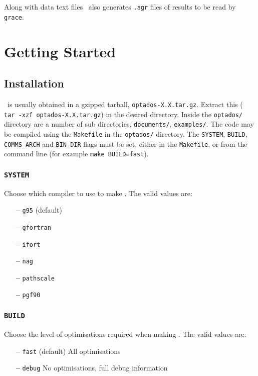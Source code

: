 \documentclass[a4paper,11pt,twoside]{book}
\begin{document}
Along with data text files \optados\ also generates \verb#.agr# files of results to be read by \verb#grace#. 


\chapter{Getting Started}\label{chap:getting_started}
\section{Installation}
\optados\ is usually obtained in a gzipped tarball, \verb#optados-X.X.tar.gz#. Extract this ( \verb# tar -xzf optados-X.X.tar.gz#) in the desired directory. Inside the  \verb#optados/# directory are a number of sub directories,  \verb#documents/#,   \verb#examples/#.  The code may be compiled using the \verb#Makefile# in the  \verb#optados/# directory.  The \verb#SYSTEM#, \verb#BUILD#, \verb#COMMS_ARCH# and \verb#BIN_DIR# flags must be set, either in the  \verb#Makefile#, or from the command line (for example  \verb#make BUILD=fast#).  

\subsection[system]{\tt SYSTEM}

Choose which compiler to use to make \optados. The valid values are:
\begin{itemize}
\item[{\bf --}]  \verb#g95# (default)
\item[{\bf --}]  \verb#gfortran#
\item[{\bf --}]  \verb#ifort#
\item[{\bf --}]  \verb#nag#
\item[{\bf --}]  \verb#pathscale#
\item[{\bf --}]  \verb#pgf90#
\end{itemize}

\subsection[build]{\tt BUILD}

Choose the level of optimisations required when making \optados.  The valid values are:
\begin{itemize}
\item[{\bf --}]  \verb#fast# (default) All optimisations
\item[{\bf --}]  \verb#debug# No optimisations, full debug information
\end{itemize}
\end{document}
